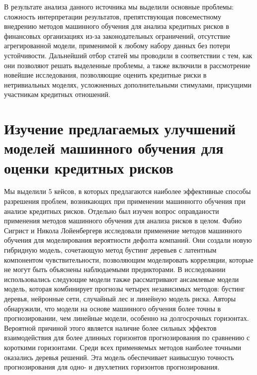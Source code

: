 \documentclass[14pt, letterpaper, twoside]{extarticle}
\begin{document}
\indent В результате анализа данного источника мы выделили основные проблемы: сложность интерпретации результатов, препятствующая повсеместному внедрению методов машинного обучения для анализа кредитных рисков в финансовых организациях из-за законодательных ограничений, отсутствие агрегированной модели, применимой к любому набору данных без потери устойчивости. Дальнейший отбор статей мы проводили в соответствии с тем, как они позволяют решать выделенные проблемы, а также включили в рассмотрение новейшие исследования, позволяющие оценить кредитные риски в нетривиальных моделях, усложненных дополнительными стимулами, присущими участникам кредитных отношений.

\section{Изучение предлагаемых улучшений моделей машинного обучения для оценки кредитных рисков}
Мы выделили 5 кейсов, в которых предлагаются наиболее эффективные способы разрешения проблем, возникающих при применении машинногго обучения при анализе кредитных рисков. 
Отдельно был изучен вопрос оправданости применения методов машинного обучения для анализа рисков в целом. Фабио Сигрист и Никола Лойенбергерв \cite{sigrist2023machine} исследовали применение методов машинного обучения для моделирования вероятности дефолта компаний. Они создали новую гибридную модель, сочетающую метод бустинг деревьев с латентным компонентом чувствительности, позволяющим моделировать корреляции, которые не могут быть объяснены наблюдаемыми предикторами. В исследовании использовались следующие модели также рассматривают ансамлевые модели модель, которая комбинирует прогнозы четырех независимых методов: бустинг деревья, нейронные сети, случайный лес и линейную модель риска. Авторы обнаружили, что модели на основе машинного обучения более точны в прогнозировании, чем линейные модели, особенно на долгосрочных горизонтах. Вероятной причиной этого является наличие более сильных эффектов взаимодействия для более длинных горизонтов прогнозирования по сравнению с короткими горизонтами. Среди всех применяемых методов наиболее точными оказались деревья решений. Эта модель обеспечивает наивысшую точность прогнозирования для одно- и двухлетних горизонтов прогнозирования.
\end{document}
